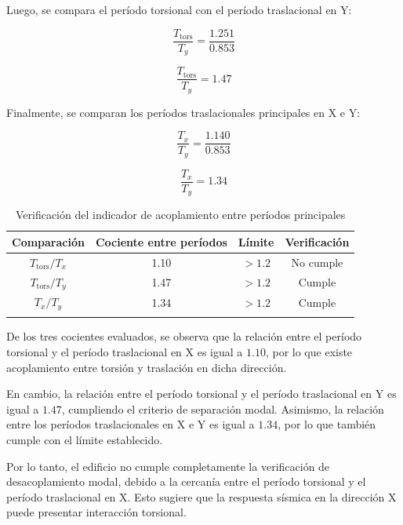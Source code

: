 Luego, se compara el período torsional con el período traslacional en Y:

\begin{equation}
\frac{T_{\text{tors}}}{T_y} = \frac{1.251}{0.853}
\end{equation}

\begin{equation}
\frac{T_{\text{tors}}}{T_y} = 1.47
\end{equation}

Finalmente, se comparan los períodos traslacionales principales en X e Y:

\begin{equation}
\frac{T_x}{T_y} = \frac{1.140}{0.853}
\end{equation}

\begin{equation}
\frac{T_x}{T_y} = 1.34
\end{equation}

\begin{table}[H]
    \centering
    \caption{Verificación del indicador de acoplamiento entre períodos principales}
    \begin{tabular}{cccc}
    \hline
    Comparación & Cociente entre períodos & Límite & Verificación \\
    \hline
    $T_{\text{tors}}/T_x$ & 1.10 & $> 1.2$ & No cumple \\
    $T_{\text{tors}}/T_y$ & 1.47 & $> 1.2$ & Cumple \\
    $T_x/T_y$ & 1.34 & $> 1.2$ & Cumple \\
    \hline
        \vspace{0.001cm}
    \end{tabular}
    
\end{table}

De los tres cocientes evaluados, se observa que la relación entre el período torsional y el período traslacional en X es igual a $1.10$, por lo que existe acoplamiento entre torsión y traslación en dicha dirección.

En cambio, la relación entre el período torsional y el período traslacional en Y es igual a $1.47$, cumpliendo el criterio de separación modal. Asimismo, la relación entre los períodos traslacionales en X e Y es igual a $1.34$, por lo que también cumple con el límite establecido.

Por lo tanto, el edificio no cumple completamente la verificación de desacoplamiento modal, debido a la cercanía entre el período torsional y el período traslacional en X. Esto sugiere que la respuesta sísmica en la dirección X puede presentar interacción torsional.

